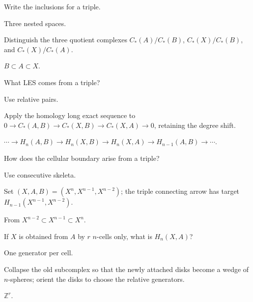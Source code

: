 \begin{exercise}\label{exr:viii19-15}
Write the inclusions for a triple.
\end{exercise}
\begin{hint}
Three nested spaces.

Distinguish the three quotient complexes \(C_*(A)/C_*(B)\), \(C_*(X)/C_*(B)\), and \(C_*(X)/C_*(A)\).
\end{hint}
\begin{solution}
\(B\subset A\subset X\).
\end{solution}

\begin{exercise}\label{exr:viii19-16}
What LES comes from a triple?
\end{exercise}
\begin{hint}
Use relative pairs.

Apply the homology long exact sequence to \(0\to C_*(A,B)\to C_*(X,B)\to C_*(X,A)\to0\), retaining the degree shift.
\end{hint}
\begin{solution}
\(\cdots\to H_n(A,B)\to H_n(X,B)\to H_n(X,A)\to H_{n-1}(A,B)\to\cdots\).
\end{solution}

\begin{exercise}\label{exr:viii19-17}
How does the cellular boundary arise from a triple?
\end{exercise}
\begin{hint}
Use consecutive skeleta.

Set \((X,A,B)=(X^n,X^{n-1},X^{n-2})\); the triple connecting arrow has target \(H_{n-1}(X^{n-1},X^{n-2})\).
\end{hint}
\begin{solution}
From \(X^{n-2}\subset X^{n-1}\subset X^n\).
\end{solution}

\begin{exercise}\label{exr:viii19-18}
If \(X\) is obtained from \(A\) by \(r\) \(n\)-cells only, what is \(H_n(X,A)\)?
\end{exercise}
\begin{hint}
One generator per cell.

Collapse the old subcomplex so that the newly attached disks become a wedge of \(n\)-spheres; orient the disks to choose the relative generators.
\end{hint}
\begin{solution}
\(\mathbb Z^r\).
\end{solution}

